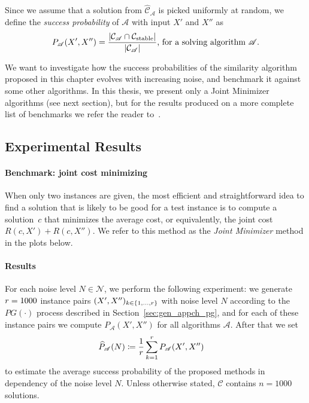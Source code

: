 Since we assume that a solution from $\hat{\mathcal{C}}_{\mathscr{A}}$ is
picked uniformly at random, we define the \emph{success probability} of $\mathscr{A}$
with input $X'$ and $X''$ as
\begin{align}
  \label{eq:uncert:prob_succ}
  P_{\mathscr{A}}(X',X'')
    = \frac{|{\mathcal{C}}_\mathscr{A}\cap\mathcal{C}_\text{stable}|}{|{\mathcal{C}}_\mathscr{A}|}
      \text{, for a solving algorithm } \mathscr{A}.
\end{align}
%

We want to investigate how the success probabilities of the similarity algorithm
proposed in this chapter evolves with increasing noise, and benchmark it against
some other algorithms. In this thesis, we present only a Joint Minimizer algorithms
(see next section), but for the results produced on a more complete list of benchmarks
we refer the reader to~\citep{jcss:2017}.

\subsection{Experimental Results}
\label{sec:continuous_noise}

\paragraph{Benchmark: joint cost minimizing}
When only two instances are given, the most efficient and straightforward idea
to find a solution that is likely to be good for a test instance is to compute
a solution~$c$ that minimizes the average cost, or equivalently, the joint cost
$R(c, X')+R(c, X'')$. We refer to this method as the \textit{Joint Minimizer}
method in the plots below.

\paragraph{Results}

For each noise level $N\in\mathcal{N}$, we perform the following
experiment: we generate $r=1000$ instance pairs $(X',X'')_{k\in\{1,\ldots,
r\}}$ with noise level $N$ according to the $PG(\cdot)$ process described in
Section~\ref{sec:gen_appch_pg}, and for each of these instance pairs we compute
$P_\mathscr{A}(X',X'')$ for all algorithms $\mathscr{A}$. After that we set
\begin{align}
  \widehat P_\mathscr{A}(N) &\coloneqq \frac{1}{r} \sum_{k=1}^{r} P_\mathscr{A}(X',X'')
\end{align}
to estimate the average success probability of the proposed methods in
dependency of the noise level $N$. Unless otherwise stated, $\mathcal{C}$
contains $n=1000$ solutions.

